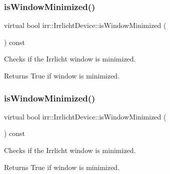 \subsubsection{\texorpdfstring{is\+Window\+Minimized()}{isWindowMinimized()}\hspace{0.1cm}{\footnotesize\ttfamily [1/2]}}
{\footnotesize\ttfamily virtual bool irr\+::\+Irrlicht\+Device\+::is\+Window\+Minimized (\begin{DoxyParamCaption}{ }\end{DoxyParamCaption}) const\hspace{0.3cm}{\ttfamily [pure virtual]}}



Checks if the Irrlicht window is minimized. 

\begin{DoxyReturn}{Returns}
True if window is minimized. 
\end{DoxyReturn}
\mbox{\label{classirr_1_1IrrlichtDevice_a69e96b9c49c65391e406377a92e795b1}} 
\subsubsection{\texorpdfstring{is\+Window\+Minimized()}{isWindowMinimized()}\hspace{0.1cm}{\footnotesize\ttfamily [2/2]}}
{\footnotesize\ttfamily virtual bool irr\+::\+Irrlicht\+Device\+::is\+Window\+Minimized (\begin{DoxyParamCaption}{ }\end{DoxyParamCaption}) const\hspace{0.3cm}{\ttfamily [pure virtual]}}



Checks if the Irrlicht window is minimized. 

\begin{DoxyReturn}{Returns}
True if window is minimized. 
\end{DoxyReturn}
\mbox{\label{classirr_1_1IrrlichtDevice_abf859e39f017b0403c6ed331e48e01df}} 
